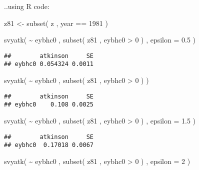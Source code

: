 \documentclass[
]{book}
\newenvironment{Shaded}{\begin{snugshade}}{\end{snugshade}}
\newcommand{\AttributeTok}[1]{\textcolor[rgb]{0.77,0.63,0.00}{#1}}
\newcommand{\DecValTok}[1]{\textcolor[rgb]{0.00,0.00,0.81}{#1}}
\newcommand{\FloatTok}[1]{\textcolor[rgb]{0.00,0.00,0.81}{#1}}
\newcommand{\FunctionTok}[1]{\textcolor[rgb]{0.00,0.00,0.00}{#1}}
\newcommand{\NormalTok}[1]{#1}
\newcommand{\OtherTok}[1]{\textcolor[rgb]{0.56,0.35,0.01}{#1}}
\newcommand{\SpecialCharTok}[1]{\textcolor[rgb]{0.00,0.00,0.00}{#1}}
\begin{document}
..using R code:

\begin{Shaded}
\begin{Highlighting}[]
\NormalTok{z81 }\OtherTok{\textless{}{-}} \FunctionTok{subset}\NormalTok{( z , year }\SpecialCharTok{==} \DecValTok{1981}\NormalTok{ )}

\FunctionTok{svyatk}\NormalTok{( }\SpecialCharTok{\textasciitilde{}}\NormalTok{ eybhc0 , }\FunctionTok{subset}\NormalTok{( z81 , eybhc0 }\SpecialCharTok{\textgreater{}} \DecValTok{0}\NormalTok{ ) , }\AttributeTok{epsilon =} \FloatTok{0.5}\NormalTok{ )}
\end{Highlighting}
\end{Shaded}

\begin{verbatim}
##        atkinson     SE
## eybhc0 0.054324 0.0011
\end{verbatim}

\begin{Shaded}
\begin{Highlighting}[]
\FunctionTok{svyatk}\NormalTok{( }\SpecialCharTok{\textasciitilde{}}\NormalTok{ eybhc0 , }\FunctionTok{subset}\NormalTok{( z81 , eybhc0 }\SpecialCharTok{\textgreater{}} \DecValTok{0}\NormalTok{ ) )}
\end{Highlighting}
\end{Shaded}

\begin{verbatim}
##        atkinson     SE
## eybhc0    0.108 0.0025
\end{verbatim}

\begin{Shaded}
\begin{Highlighting}[]
\FunctionTok{svyatk}\NormalTok{( }\SpecialCharTok{\textasciitilde{}}\NormalTok{ eybhc0 , }\FunctionTok{subset}\NormalTok{( z81 , eybhc0 }\SpecialCharTok{\textgreater{}} \DecValTok{0}\NormalTok{ ) , }\AttributeTok{epsilon =} \FloatTok{1.5}\NormalTok{ )}
\end{Highlighting}
\end{Shaded}

\begin{verbatim}
##        atkinson     SE
## eybhc0  0.17018 0.0067
\end{verbatim}

\begin{Shaded}
\begin{Highlighting}[]
\FunctionTok{svyatk}\NormalTok{( }\SpecialCharTok{\textasciitilde{}}\NormalTok{ eybhc0 , }\FunctionTok{subset}\NormalTok{( z81 , eybhc0 }\SpecialCharTok{\textgreater{}} \DecValTok{0}\NormalTok{ ) , }\AttributeTok{epsilon =} \DecValTok{2}\NormalTok{ )}
\end{Highlighting}
\end{Shaded}
\end{document}
